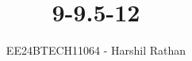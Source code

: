 \documentclass[journal]{IEEEtran}
\begin{document}

\vspace{3cm}

\title{9-9.5-12}
\author{EE24BTECH11064 - Harshil Rathan}
 \maketitle
{\let\newpage\relax\maketitle}

\renewcommand{\thefigure}{\theenumi}
\renewcommand{\thetable}{\theenumi}
\setlength{\intextsep}{10pt} %


\renewcommand{\thetable}{\theenumi}
\end{document}
